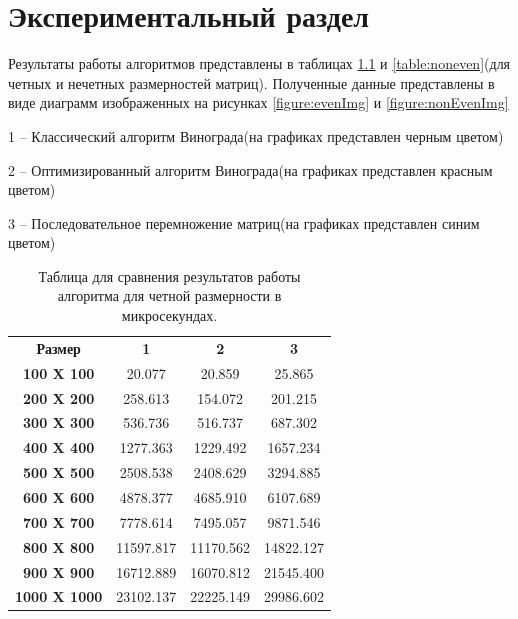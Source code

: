 \chapter{ Экспериментальный раздел}
Результаты работы алгоритмов представлены в таблицах \ref{table:even} и \ref{table:noneven}(для четных и нечетных размерностей матриц). Полученные данные представлены в виде диаграмм изображенных на рисунках \ref{figure:evenImg} и \ref{figure:nonEvenImg}

1 -- Классический алгоритм Винограда(на графиках представлен черным цветом)

2 -- Оптимизированный алгоритм Винограда(на графиках представлен красным цветом)

3 -- Последовательное перемножение матриц(на графиках представлен синим цветом)

\begin{table}
	\caption{Таблица для сравнения результатов работы алгоритма для четной размерности в микросекундах.}\label{table:even}
	\begin{center}
		\begin{tabular}{cccc}
            \textbf{Размер} & \textbf{1} & \textbf{2} & \textbf{3}\\
            \textbf{100 X 100} & 20.077 & 20.859 & 25.865 \\
            \textbf{200 X 200} & 258.613 & 154.072 & 201.215 \\
            \textbf{300 X 300} & 536.736 & 516.737 & 687.302 \\
            \textbf{400 X 400} & 1277.363 & 1229.492 & 1657.234 \\
            \textbf{500 X 500} & 2508.538 & 2408.629 & 3294.885 \\
            \textbf{600 X 600} & 4878.377 & 4685.910 & 6107.689 \\
            \textbf{700 X 700} & 7778.614 & 7495.057 & 9871.546 \\
            \textbf{800 X 800} & 11597.817 & 11170.562 & 14822.127 \\
            \textbf{900 X 900} & 16712.889 & 16070.812 & 21545.400 \\
            \textbf{1000 X 1000} & 23102.137 & 22225.149 & 29986.602 \\
		\end{tabular}
	\end{center}
\end{table}

